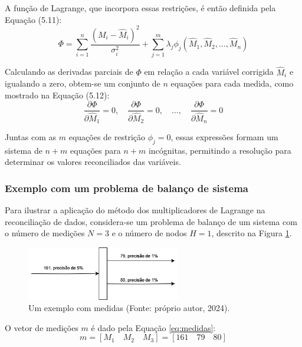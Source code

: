 A função de Lagrange, que incorpora essas restrições, é então definida pela Equação (5.11):
\begin{equation}
	\Phi = \sum_{i=1}^n \frac{(M_i - \hat{M}_i)^2}{\sigma_i^2} + \sum_{j=1}^m \lambda_j \phi_j(\hat{M}_1, \hat{M}_2, \dots, \hat{M}_n)
\end{equation}

Calculando as derivadas parciais de $\Phi$ em relação a cada variável corrigida $\hat{M}_i$ e igualando a zero, obtem-se um conjunto de $n$ equações para cada medida, como mostrado na Equação (5.12):
\begin{equation}
	\frac{\partial \Phi}{\partial \hat{M}_1} = 0, \quad \frac{\partial \Phi}{\partial \hat{M}_2} = 0, \quad \dots, \quad \frac{\partial \Phi}{\partial \hat{M}_n} = 0
\end{equation}

Juntas com as $m$ equações de restrição $\phi_j = 0$, essas expressões formam um sistema de $n + m$ equações para $n + m$ incógnitas, permitindo a resolução para determinar os valores reconciliados das variáveis.

\subsubsection{Exemplo com um problema de balanço de sistema}
Para ilustrar a aplicação do método dos multiplicadores de Lagrange na reconciliação de dados, considera-se um problema de balanço de um sistema com o número de medições \(N = 3\) e o número de nodos \(H = 1\), descrito na Figura \ref{Fig:ExemploImage}.

\begin{figure}[htbp]
    \centering
    \includegraphics[width=0.6\textwidth]{figuras/exemplo-problema.png}
    \caption{Um exemplo com medidas (Fonte: próprio autor, 2024).}
    \label{Fig:ExemploImage}
\end{figure}

O vetor de medições \(m\) é dado pela Equação \eqref{eq:medidas}:
\begin{equation}
    m = [M_1 \quad M_2 \quad M_3] = [161 \quad 79 \quad 80]
    \label{eq:medidas}
\end{equation}

